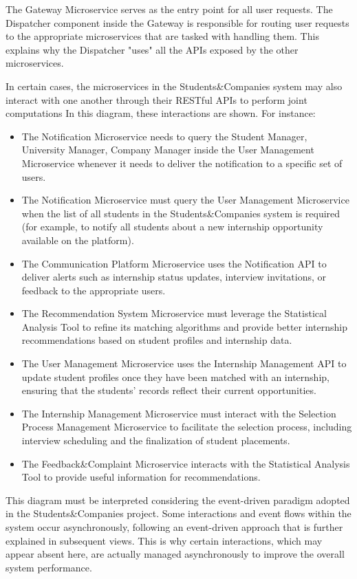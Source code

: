 The Gateway Microservice serves as the entry point for all user requests. The Dispatcher component inside the Gateway is responsible for routing user requests to the appropriate microservices that are tasked with handling them. This explains why the Dispatcher "uses" all the APIs exposed by the other microservices.

In certain cases, the microservices in the Students\&Companies system may also interact with one another through their RESTful APIs to perform joint computations In this diagram, these interactions are shown. For
instance:

\begin{itemize}
    \item The Notification Microservice needs to query the Student Manager, University Manager, Company Manager inside the User Management Microservice whenever it needs to deliver the notification to a specific set of users.
    \item The Notification Microservice must query the User Management Microservice when the list of all students in the Students\&Companies system is required (for example, to notify all students about a new internship opportunity available on the platform).
    \item The Communication Platform Microservice uses the Notification API to deliver alerts such as internship status updates, interview invitations, or feedback to the appropriate users.
    \item The Recommendation System Microservice must leverage the Statistical Analysis Tool to refine its matching algorithms and provide better internship recommendations based on student profiles and internship data.
    \item The User Management Microservice uses the Internship Management API to update student profiles once they have been matched with an internship, ensuring that the students' records reflect their current opportunities.
    \item The Internship Management Microservice must interact with the Selection Process Management Microservice to facilitate the selection process, including interview scheduling and the finalization of student placements.
    \item The Feedback\&Complaint Microservice interacts with the Statistical Analysis Tool to provide useful information for recommendations.
\end{itemize}

This diagram must be interpreted considering the event-driven paradigm adopted in the Students\&Companies project. Some interactions and event flows within the system occur asynchronously, following an event-driven approach that is further explained in subsequent views. This is why certain interactions, which may appear absent here, are actually managed asynchronously to improve the overall system performance.

